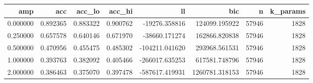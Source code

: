 \begin{tabular}{rrrrrrrr}
\toprule
amp & acc & acc\_lo & acc\_hi & ll & bic & n & k\_params \\
\midrule
0.000000 & 0.892365 & 0.883322 & 0.900762 & -19276.358816 & 124099.195922 & 57946 & 1828 \\
0.250000 & 0.657578 & 0.640146 & 0.671970 & -38660.171274 & 162866.820838 & 57946 & 1828 \\
0.500000 & 0.470956 & 0.455475 & 0.485302 & -104211.041620 & 293968.561531 & 57946 & 1828 \\
1.000000 & 0.393763 & 0.382092 & 0.405466 & -266017.635253 & 617581.748796 & 57946 & 1828 \\
2.000000 & 0.386463 & 0.375070 & 0.397478 & -587617.419931 & 1260781.318153 & 57946 & 1828 \\
\bottomrule
\end{tabular}
